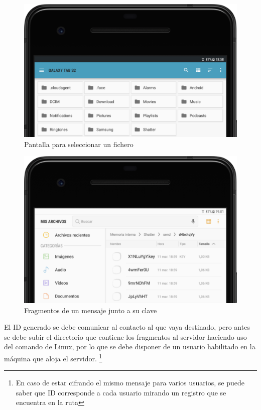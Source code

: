 \begin{figure}[!htb]
  \centering
  \includegraphics[scale=0.4]{Figures/file_picker}
  \decoRule
  \caption[Shatter (\emph{File Picker})]{Pantalla para seleccionar un fichero}
  \label{fig:file_picker}
\end{figure}

\begin{figure}[!htb]
  \centering
  \includegraphics[scale=0.4]{Figures/encfiles}
  \decoRule
  \caption[Shatter (Mensaje fragmentado)]{Fragmentos de un mensaje junto a su clave}
  \label{fig:encfiles}
\end{figure}

El ID generado se debe comunicar al contacto al que vaya destinado, pero antes se debe subir el directorio que contiene los fragmentos al servidor haciendo uso del comando  de Linux, por lo que se debe disponer de un usuario habilitado en la máquina que aloja el servidor. \footnote{En caso de estar cifrando el mismo mensaje para varios usuarios, se puede saber que ID corresponde a cada usuario mirando un registro que se encuentra en la ruta }

